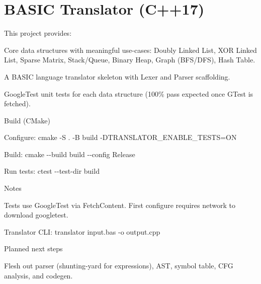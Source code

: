 \chapter{BASIC Translator (C++17) }
\hypertarget{index}{}\label{index}
\label{index_md__r_e_a_d_m_e}%
%


This project provides\+:
\begin{DoxyItemize}
\item Core data structures with meaningful use-\/cases\+: Doubly Linked List, XOR Linked List, Sparse Matrix, Stack/\+Queue, Binary Heap, Graph (BFS/\+DFS), Hash Table.
\item A BASIC language translator skeleton with Lexer and Parser scaffolding.
\item Google\+Test unit tests for each data structure (100\% pass expected once GTest is fetched).
\end{DoxyItemize}

Build (CMake)
\begin{DoxyItemize}
\item Configure\+: {\ttfamily cmake -\/S . -\/B build -\/DTRANSLATOR\+\_\+\+ENABLE\+\_\+\+TESTS=ON}
\item Build\+: {\ttfamily cmake -\/-\/build build -\/-\/config Release}
\item Run tests\+: {\ttfamily ctest -\/-\/test-\/dir build}
\end{DoxyItemize}

Notes
\begin{DoxyItemize}
\item Tests use Google\+Test via Fetch\+Content. First configure requires network to download googletest.
\item Translator CLI\+: {\ttfamily translator input.\+bas -\/o output.\+cpp}
\end{DoxyItemize}

Planned next steps
\begin{DoxyItemize}
\item Flesh out parser (shunting-\/yard for expressions), AST, symbol table, CFG analysis, and codegen. 
\end{DoxyItemize}